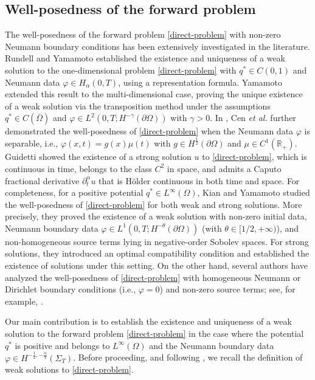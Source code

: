 \documentclass[a4paper,12pt,reqno,natbib]{amsart}
\begin{document}
\subsection{Well-posedness of the forward problem}


The well-posedness of the forward problem \eqref{direct-problem} with non-zero Neumann boundary conditions has been extensively investigated in the literature. Rundell and Yamamoto \cite{rundell2023uniqueness10} established the existence and uniqueness of a weak solution to the one-dimensional problem \eqref{direct-problem} with $q^* \in C(0,1)$ and Neumann data $\varphi \in H_\alpha(0,T)$, using a representation formula. Yamamoto \cite{yamamoto2018} extended this result to the multi-dimensional case, proving the unique existence of a weak solution via the transposition method under the assumptions $q^* \in C(\overline{\Omega})$ and $\varphi \in L^2(0,T;H^{-\gamma}(\partial\Omega))$ with $\gamma>0$. In \cite{cen2023recovery}, Cen \emph{et al.} further demonstrated the well-posedness of \eqref{direct-problem} when the Neumann data $\varphi$ is separable, i.e., $\varphi(x,t) = g(x)\mu(t)$ with $g \in H^{\frac{1}{2}}(\partial\Omega)$ and $\mu \in C^1(\mathbb{R}_+)$. Guidetti \cite{guidetti2019maximal} showed the existence of a strong solution $u$ to \eqref{direct-problem}, which is continuous in time, belongs to the class $C^2$ in space, and admits a Caputo fractional derivative $\partial_t^\alpha u$ that is H\"older continuous in both time and space.
For completeness, for a positive potential $q^*\in L^\infty(\Omega)$, Kian and Yamamoto \cite{kian2021well} studied the well-posedness of \eqref{direct-problem} for both weak and strong solutions. More precisely, they proved the existence of a weak solution with non-zero initial data, Neumann boundary data $\varphi \in L^1(0,T;H^{-\theta}(\partial\Omega))$ (with $\theta \in [1/2,+\infty)$), and non-homogeneous source terms lying in negative-order Sobolev spaces. For strong solutions, they introduced an optimal compatibility condition and established the existence of solutions under this setting.
On the other hand, several authors have analyzed the well-posedness of \eqref{direct-problem} with homogeneous Neumann or Dirichlet boundary conditions (i.e., $\varphi=0$) and non-zero source terms; see, for example, \cite{sakamoto2011initial,zacher2009weak11}.


Our main contribution is to establish the existence and uniqueness of a weak solution to the forward problem \eqref{direct-problem} in the case where the potential $q^*$ is positive and belongs to $L^\infty(\Omega)$ and the Neumann boundary data $\varphi\in H^{-\frac{1}{2},-\frac{\alpha}{4}}(\Sigma_{T})$. Before proceeding, and following \cite{li2009space}, we recall the definition of weak solutions to \eqref{direct-problem}.
\end{document}
